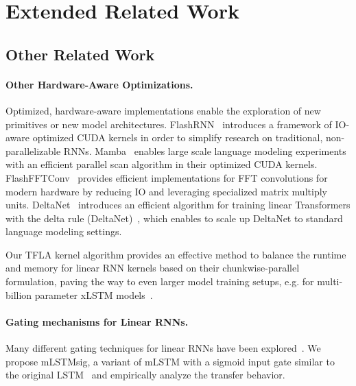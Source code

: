 \documentclass{article}
\begin{document}
    \newpage
    \section{Extended Related Work}
    \label{app:related_work}



    \subsection{Other Related Work}
    \label{app:related_work_other}
    \paragraph{Other Hardware-Aware Optimizations.}
    Optimized, hardware-aware implementations enable the exploration of new primitives or new model architectures.
    FlashRNN~\cite{poeppel:25flashrnn} introduces a framework of IO-aware optimized CUDA kernels in order to simplify research on traditional, non-parallelizable RNNs.
    Mamba~\citep{Gu:24mamba} enables large scale language modeling experiments~\citep{waleffe:24empiricalstudymamba} with an efficient parallel scan algorithm in their optimized CUDA kernels.
    FlashFFTConv~\citep{fu:24flashfftconv} provides efficient implementations for FFT convolutions for modern hardware by reducing IO and leveraging specialized matrix multiply units.
    DeltaNet~\cite{yang:24parallelizing, yang:24gateddeltanet} introduces an efficient algorithm for training linear Transformers with the delta rule (DeltaNet)~\citep{schlag:21lineartransformers}, which enables to scale up DeltaNet to standard language modeling settings.

    Our TFLA kernel algorithm provides an effective method to balance the runtime and memory for linear RNN kernels based on their chunkwise-parallel formulation,
    paving the way to even larger model training setups, e.g. for multi-billion parameter xLSTM models~\citep{beck:25xlstm7b}.
    \paragraph{Gating mechanisms for Linear RNNs.}
    Many different gating techniques for linear RNNs have been explored~\citep{sun:23retentive, beck:24xlstm, yang:24gated, Gu:24mamba, dao:24transformersaressms, sun:24youonlycacheonce, qin:24hgrn2, orvieto:23lru, katsch:23gateloop, peng:24rwkv5_6}.
    We propose mLSTMsig, a variant of mLSTM with a sigmoid input gate similar to the original LSTM~\citep{Hochreiter:91, Hochreiter:97lstm} and empirically analyze the transfer behavior.
    
\end{document}

